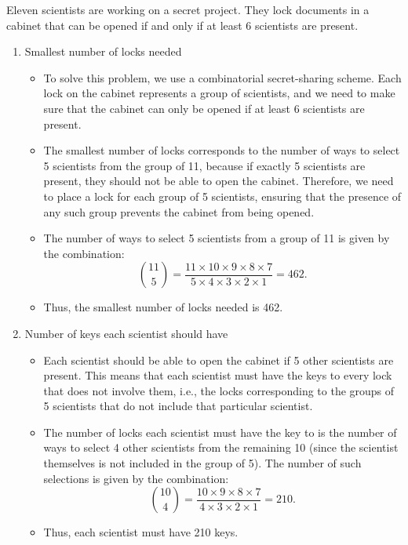     \begin{example}
        Eleven scientists are working on a secret project. They lock documents in a cabinet that can be opened if and only if at least 6 scientists are present.

        \begin{enumerate}
            \item Smallest number of locks needed
            \begin{itemize}
                \item To solve this problem, we use a combinatorial secret-sharing scheme. Each lock on the cabinet represents a group of scientists, and we need to make sure that the cabinet can only be opened if at least 6 scientists are present.
                \item The smallest number of locks corresponds to the number of ways to select 5 scientists from the group of 11, because if exactly 5 scientists are present, they should not be able to open the cabinet. Therefore, we need to place a lock for each group of 5 scientists, ensuring that the presence of any such group prevents the cabinet from being opened.
                \item The number of ways to select 5 scientists from a group of 11 is given by the combination:
                \[
                \binom{11}{5} = \frac{11 \times 10 \times 9 \times 8 \times 7}{5 \times 4 \times 3 \times 2 \times 1} = 462.
                \]
                \item Thus, the smallest number of locks needed is 462.
            \end{itemize}

            \item Number of keys each scientist should have
            \begin{itemize}
                \item Each scientist should be able to open the cabinet if 5 other scientists are present. This means that each scientist must have the keys to every lock that does not involve them, i.e., the locks corresponding to the groups of 5 scientists that do not include that particular scientist.
    
                \item The number of locks each scientist must have the key to is the number of ways to select 4 other scientists from the remaining 10 (since the scientist themselves is not included in the group of 5). The number of such selections is given by the combination:
                \[
                \binom{10}{4} = \frac{10 \times 9 \times 8 \times 7}{4 \times 3 \times 2 \times 1} = 210.
                \]
                \item Thus, each scientist must have 210 keys.
            \end{itemize}
        \end{enumerate}


\end{example}
